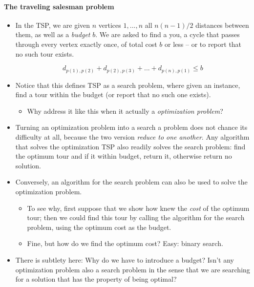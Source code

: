 \documentclass[a4paper,11pt]{article}
\begin{document}
\paragraph{The traveling salesman
problem}\label{the-traveling-salesman-problem}

\begin{itemize}
\item
  In the TSP, we are given $n$ vertices $1, ..., n$ all $n(n - 1)/2$
  distances between them, as well as a \emph{budget} $b$. We are asked
  to find a you, a cycle that passes through every vertex exactly once,
  of total cost $b$ or less -- or to report that no such tour exists.

  \[d_{p(1),p(2)} + d_{p(2),p(3)} + ... + d_{p(n),p(1)} \le b\]
\item
  Notice that this defines TSP as a search problem, where given an
  instance, find a tour within the budget (or report that no such one
  exists).

  \begin{itemize}
  \itemsep1pt\parskip0pt
  \item
    Why address it like this when it actually a \emph{optimization
    problem}?
  \end{itemize}
\item
  Turning an optimization problem into a search a problem does not
  chance its difficulty at all, because the two version \emph{reduce to
  one another}. Any algorithm that solves the optimization TSP also
  readily solves the search problem: find the optimum tour and if it
  within budget, return it, otherwise return no solution.
\item
  Conversely, an algorithm for the search problem can also be used to
  solve the optimization problem.

  \begin{itemize}
  \itemsep1pt\parskip0pt
  \item
    To see why, first suppose that we show how knew the \emph{cost} of
    the optimum tour; then we could find this tour by calling the
    algorithm for the search problem, using the optimum cost as the
    budget.
  \item
    Fine, but how do we find the optimum cost? Easy: binary search.
  \end{itemize}
\item
  There is subtlety here: Why do we have to introduce a budget? Isn't
  any optimization problem also a search problem in the sense that we
  are searching for a solution that has the property of being optimal?


\end{itemize}
\end{document}
